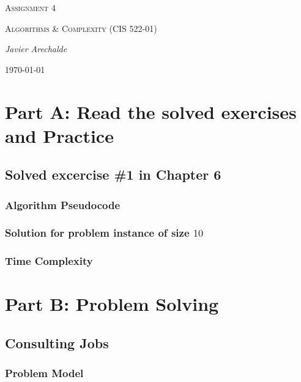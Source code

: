 \documentclass{article}
\begin{document}
\begin{titlepage}
	\centering
	{\scshape\LARGE Assignment 4\par}
	\vspace{1cm}
	{\scshape\Large Algorithms \& Complexity (CIS 522-01)\par}
	\vspace{1.5cm}
	{\Large\itshape Javier Arechalde\par}
	\vfill
	{\large \today\par}
\end{titlepage}

\section*{Part A: Read the solved exercises and Practice}

\subsection*{Solved excercise \#1 in Chapter 6}

\subsubsection*{Algorithm Pseudocode}

\subsubsection*{Solution for problem instance of size $10$}

\subsubsection*{Time Complexity}


\section*{Part B: Problem Solving}


\subsection*{Consulting Jobs}

\subsubsection*{Problem Model}
\end{document}
